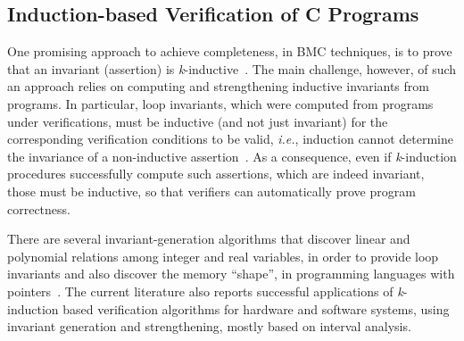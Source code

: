 \documentclass{acm_sen_article}
\begin{document}

\subsection{Induction-based Verification of C Programs}

One promising approach to achieve completeness, in BMC techniques, is to prove that an invariant (assertion) is \textit{k}-inductive~\cite{EenS03,Sheera00}. The main challenge, however, of such an approach relies on computing and strengthening inductive invariants from programs. In particular, loop invariants, which were computed from programs under verifications, must be inductive (and not just invariant) for the corresponding verification conditions to be valid, {\it i.e.}, induction cannot determine the invariance of a non-inductive assertion~\cite{Bradley07}. As a consequence, even if \textit{k}-induction procedures successfully compute such assertions, which are indeed invariant, those must be inductive, so that verifiers can automatically prove program correctness.

There are several invariant-generation algorithms that discover linear and polynomial relations among integer and real variables, in order to provide loop invariants and also discover the memory ``shape'', in programming languages with pointers~\cite{pips:2013,Henry:2012}. The current literature also reports successful applications of \textit{k}-induction based verification algorithms for hardware and software systems, using invariant generation and strengthening, mostly based on interval analysis. 
\end{document}
